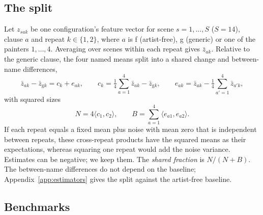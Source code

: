 \documentclass[10pt]{article}
\newcommand{\ip}[2]{\langle #1,#2\rangle}
\begin{document}
\subsection{The split}\label{sec:split}

Let $z_{sak}$ be one configuration's feature vector for scene $s=1,\dots,S$ ($S=14$), clause $a$
and repeat $k\in\{1,2\}$, where $a$ is f (artist-free), g (generic) or one of the painters
$1,\dots,4$. Averaging over scenes within each repeat gives $\bar z_{ak}$. Relative to the
generic clause, the four named means split into a shared change and between-name differences,
\begin{equation}
\bar z_{ak}-\bar z_{\mathrm{g}k}=c_k+e_{ak},\qquad
c_k=\tfrac14\sum_{a=1}^4\bar z_{ak}-\bar z_{\mathrm{g}k},\qquad
e_{ak}=\bar z_{ak}-\tfrac14\sum_{a'=1}^4\bar z_{a'k},
\label{eq:split}
\end{equation}
with squared sizes
\begin{equation}
N=4\ip{c_1}{c_2},\qquad B=\sum_{a=1}^4\ip{e_{a1}}{e_{a2}}.
\label{eq:components}
\end{equation}
If each repeat equals a fixed mean plus noise with mean zero that is independent between
repeats, these cross-repeat products have the squared means as their expectations, whereas
squaring one repeat would add the noise variance. Estimates can be negative; we keep them. The
\emph{shared fraction} is $N/(N+B)$. The between-name differences do not depend on the baseline;
Appendix~\ref{app:estimators} gives the split against the artist-free baseline.

\subsection{Benchmarks}\label{sec:benchmarks}
\end{document}
